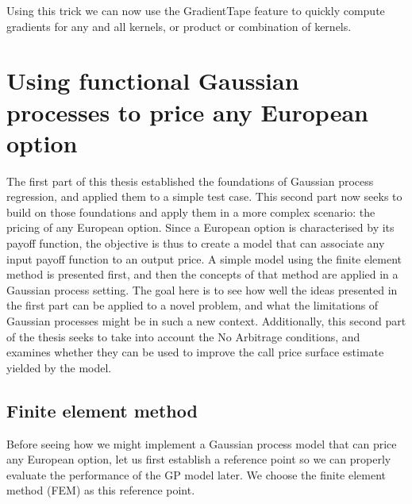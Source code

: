\documentclass[a4paper,12pt]{article}
\begin{document}
Using this trick we can now use the GradientTape feature to quickly compute gradients for any and all kernels, or product or combination of kernels.

\newpage
\section{Using functional Gaussian processes to price any European option}
The first part of this thesis established the foundations of Gaussian process regression, and applied them to a simple test case. This second part now seeks to build on those foundations and apply them in a more complex scenario: the pricing of any European option. Since a European option is characterised by its payoff function, the objective is thus to create a model that can associate any input payoff function to an output price. A simple model using the finite element method is presented first, and then the concepts of that method are applied in a Gaussian process setting. The goal here is to see how well the ideas presented in the first part can be applied to a novel problem, and what the limitations of Gaussian processes might be in such a new context. Additionally, this second part of the thesis seeks to take into account the No Arbitrage conditions, and examines whether they can be used to improve the call price surface estimate yielded by the model.

\subsection{Finite element method}
Before seeing how we might implement a Gaussian process model that can price any European option, let us first establish a reference point so we can properly evaluate the performance of the GP model later. We choose the finite element method (FEM) as this reference point.
\end{document}
